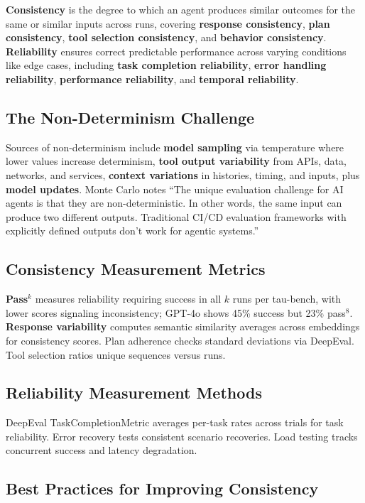 \begin{TNtwocol}
\textbf{Consistency} is the degree to which an agent produces similar outcomes for the same or similar inputs across runs, covering \textbf{response consistency}, \textbf{plan consistency}, \textbf{tool selection consistency}, and \textbf{behavior consistency}. \textbf{Reliability} ensures correct predictable performance across varying conditions like edge cases, including \textbf{task completion reliability}, \textbf{error handling reliability}, \textbf{performance reliability}, and \textbf{temporal reliability}.

\subsection*{The Non-Determinism Challenge}

Sources of non-determinism include \textbf{model sampling} via temperature where lower values increase determinism, \textbf{tool output variability} from APIs, data, networks, and services, \textbf{context variations} in histories, timing, and inputs, plus \textbf{model updates}. Monte Carlo notes ``The unique evaluation challenge for AI agents is that they are non-deterministic. In other words, the same input can produce two different outputs. Traditional CI/CD evaluation frameworks with explicitly defined outputs don't work for agentic systems.''

\subsection*{Consistency Measurement Metrics}

\textbf{Pass$^k$} measures reliability requiring success in all $k$ runs per tau-bench, with lower scores signaling inconsistency; GPT-4o shows 45\% success but 23\% pass$^8$. \textbf{Response variability} computes semantic similarity averages across embeddings for consistency scores. Plan adherence checks standard deviations via DeepEval. Tool selection ratios unique sequences versus runs.

\subsection*{Reliability Measurement Methods}

DeepEval TaskCompletionMetric averages per-task rates across trials for task reliability. Error recovery tests consistent scenario recoveries. Load testing tracks concurrent success and latency degradation.

\subsection*{Best Practices for Improving Consistency}


\end{TNtwocol}

